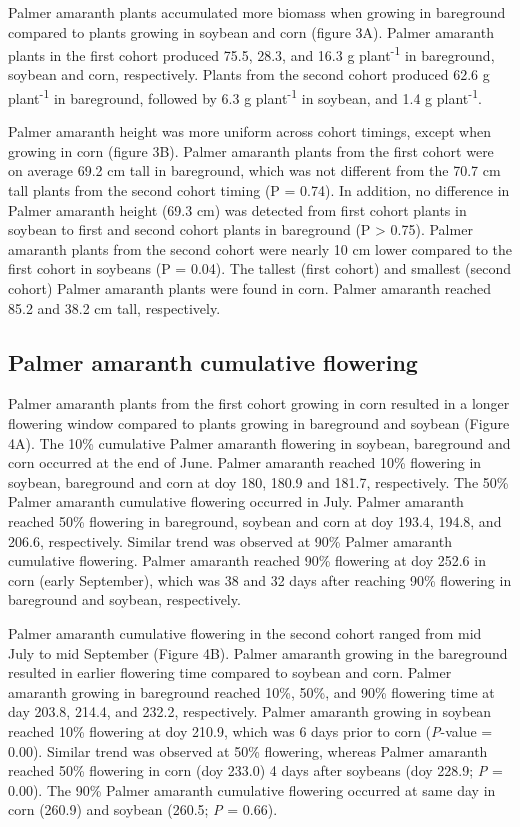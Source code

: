 \documentclass[utf8]{frontiersSCNS}
\begin{document}
Palmer amaranth plants accumulated more biomass when growing in
bareground compared to plants growing in soybean and corn (figure 3A).
Palmer amaranth plants in the first cohort produced 75.5, 28.3, and 16.3
g plant\textsuperscript{-1} in bareground, soybean and corn,
respectively. Plants from the second cohort produced 62.6 g
plant\textsuperscript{-1} in bareground, followed by 6.3 g
plant\textsuperscript{-1} in soybean, and 1.4 g
plant\textsuperscript{-1}.

Palmer amaranth height was more uniform across cohort timings, except
when growing in corn (figure 3B). Palmer amaranth plants from the first
cohort were on average 69.2 cm tall in bareground, which was not
different from the 70.7 cm tall plants from the second cohort timing (P
= 0.74). In addition, no difference in Palmer amaranth height (69.3 cm)
was detected from first cohort plants in soybean to first and second
cohort plants in bareground (P \textgreater{} 0.75). Palmer amaranth
plants from the second cohort were nearly 10 cm lower compared to the
first cohort in soybeans (P = 0.04). The tallest (first cohort) and
smallest (second cohort) Palmer amaranth plants were found in corn.
Palmer amaranth reached 85.2 and 38.2 cm tall, respectively.

\hypertarget{palmer-amaranth-cumulative-flowering}{%
\subsection*{Palmer amaranth cumulative
flowering}\label{palmer-amaranth-cumulative-flowering}}

Palmer amaranth plants from the first cohort growing in corn resulted in
a longer flowering window compared to plants growing in bareground and
soybean (Figure 4A). The 10\% cumulative Palmer amaranth flowering in
soybean, bareground and corn occurred at the end of June. Palmer
amaranth reached 10\% flowering in soybean, bareground and corn at doy
180, 180.9 and 181.7, respectively. The 50\% Palmer amaranth cumulative
flowering occurred in July. Palmer amaranth reached 50\% flowering in
bareground, soybean and corn at doy 193.4, 194.8, and 206.6,
respectively. Similar trend was observed at 90\% Palmer amaranth
cumulative flowering. Palmer amaranth reached 90\% flowering at doy
252.6 in corn (early September), which was 38 and 32 days after reaching
90\% flowering in bareground and soybean, respectively.

Palmer amaranth cumulative flowering in the second cohort ranged from
mid July to mid September (Figure 4B). Palmer amaranth growing in the
bareground resulted in earlier flowering time compared to soybean and
corn. Palmer amaranth growing in bareground reached 10\%, 50\%, and 90\%
flowering time at day 203.8, 214.4, and 232.2, respectively. Palmer
amaranth growing in soybean reached 10\% flowering at doy 210.9, which
was 6 days prior to corn (\emph{P}-value = 0.00). Similar trend was
observed at 50\% flowering, whereas Palmer amaranth reached 50\%
flowering in corn (doy 233.0) 4 days after soybeans (doy 228.9; \emph{P}
= 0.00). The 90\% Palmer amaranth cumulative flowering occurred at same
day in corn (260.9) and soybean (260.5; \emph{P} = 0.66).
\end{document}
